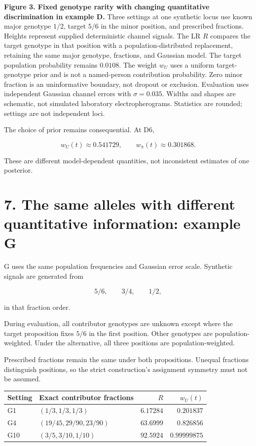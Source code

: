 \documentclass[
]{article}
\newcounter{none} %
\begin{document}
\textbf{Figure 3. Fixed genotype rarity with changing quantitative
discrimination in example D.} Three settings at one synthetic locus use
known major genotype \(1/2\), target \(5/6\) in the minor position, and
prescribed fractions. Heights represent supplied deterministic channel
signals. The LR \(R\) compares the target genotype in that position with
a population-distributed replacement, retaining the same major genotype,
fractions, and Gaussian model. The target population probability remains
\(0.0108\). The weight \(w_U\) uses a uniform target-genotype prior and
is not a named-person contribution probability. Zero minor fraction is
an uninformative boundary, not dropout or exclusion. Evaluation uses
independent Gaussian channel errors with \(\sigma=0.035\). Widths and
shapes are schematic, not simulated laboratory electropherograms.
Statistics are rounded; settings are not independent loci.

The choice of prior remains consequential. At D6,

\[
w_U(t)\approx0.541729,
\qquad
w_\pi(t)\approx0.301868.
\]

These are different model-dependent quantities, not inconsistent
estimates of one posterior.

\section{7. The same alleles with different quantitative information:
example
G}\label{the-same-alleles-with-different-quantitative-information-example-g}

G uses the same population frequencies and Gaussian error scale.
Synthetic signals are generated from

\[
5/6,\qquad3/4,\qquad1/2,
\]

in that fraction order.

During evaluation, all contributor genotypes are unknown except where
the target proposition fixes \(5/6\) in the first position. Other
genotypes are population-weighted. Under the alternative, all three
positions are population-weighted.

Prescribed fractions remain the same under both propositions. Unequal
fractions distinguish positions, so the strict construction's assignment
symmetry must not be assumed.

{\def\LTcaptype{none} %
\begin{longtable}[]{@{}llrr@{}}
\toprule\noalign{}
Setting & Exact contributor fractions & \(R\) & \(w_U(t)\) \\
\midrule\noalign{}
\endhead
\bottomrule\noalign{}
\endlastfoot
G1 & \((1/3,1/3,1/3)\) & \(6.17284\) & \(0.201837\) \\
G4 & \((19/45,29/90,23/90)\) & \(63.6999\) & \(0.826856\) \\
G10 & \((3/5,3/10,1/10)\) & \(92.5924\) & \(0.99999875\) \\
\end{longtable}
}
\end{document}
